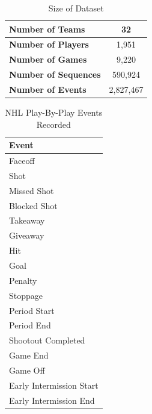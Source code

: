 \documentclass[]{article}
\begin{document}
\begin{table}[htb]
\caption{Size of Dataset}
\label{table:size-of-dataset}
\begin{center}
\begin{tabular}{|l|c|}
\hline
\bf{Number of Teams} & 32 \\ \hline
\bf{Number of Players} & 1,951 \\ \hline
\bf{Number of Games} & 9,220 \\ \hline
\bf{Number of Sequences} & 590,924 \\ \hline
\bf{Number of Events} & 2,827,467 \\ \hline
\end{tabular}
\end{center}
\end{table}

\begin{table}[htb]
\caption{NHL Play-By-Play Events Recorded}
\label{table:events-recorded}
\begin{center}
\begin{tabular}{|l|}
\hline
 \bf{Event} \\ \hline
Faceoff \\ \hline
Shot \\ \hline
Missed Shot \\ \hline
Blocked Shot \\ \hline
Takeaway \\ \hline
Giveaway \\ \hline
Hit \\ \hline
Goal \\ \hline \hline
Penalty \\ \hline
Stoppage \\ \hline
Period Start \\ \hline
Period End \\ \hline
Shootout Completed \\ \hline
Game End \\ \hline
Game Off \\ \hline
Early Intermission Start \\ \hline
Early Intermission End \\ \hline
\end{tabular}
\end{center}
\end{table}
\end{document}
